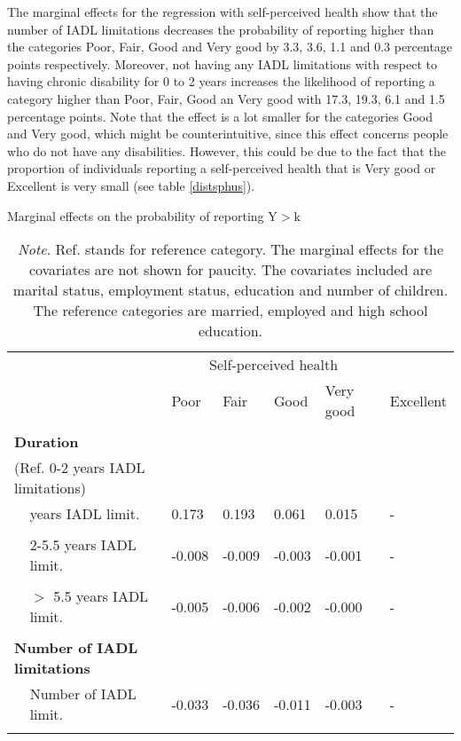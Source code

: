 \documentclass[12pt]{article}
\begin{document}
The marginal effects for the regression with self-perceived health show that the number of IADL limitations decreases the probability of reporting higher than the categories Poor, Fair, Good and Very good by 3.3, 3.6, 1.1 and 0.3 percentage points respectively. Moreover, not having any IADL limitations with respect to having chronic disability for 0 to 2 years increases the likelihood of reporting a category higher than Poor, Fair, Good an Very good with 17.3, 19.3, 6.1 and 1.5 percentage points. Note that the effect is a lot smaller for the categories Good and Very good, which might be counterintuitive, since this effect concerns people who do not have any disabilities. However, this could be due to the fact that the proportion of individuals reporting a self-perceived health that is Very good or Excellent is very small (see table \ref{distsphus}). 

\begin{table}[htbp]
\centering
\footnotesize
\caption{Marginal effects on the probability of reporting Y$>$k}
\label{marginalsphus}
\begin{tabular}{ll lllll}
\hline
&& \multicolumn{4}{c}{Self-perceived health}\\
&& Poor & Fair & Good & Very good & Excellent \\\\\hline\hline
\multicolumn{2}{l}{\textbf{Duration}} \\
\multicolumn{2}{l}{(Ref. 0-2 years IADL limitations)}\\
& years IADL limit.      &  0.173 &  0.193 &  0.061 &  0.015 & - \\
                 &&&& \\
& 2-5.5 years IADL limit.  & -0.008 & -0.009 & -0.003 & -0.001 & - \\
                &&&& \\
& $>$ 5.5 years IADL limit.& -0.005 & -0.006 & -0.002 & -0.000 & - \\
                 &&&& \\
\multicolumn{2}{l}{\textbf{Number of IADL limitations}}\\   
& Number of IADL limit.    & -0.033 & -0.036 & -0.011 & -0.003 & - \\
                                        &&&& \\
\hline
\end{tabular}
\caption*{\footnotesize{\textit{Note}. Ref. stands for reference category. The marginal effects for the covariates are not shown for paucity. The covariates included are marital status, employment status, education and number of children. The reference categories are married, employed and high school education.}}
\end{table}
\end{document}
